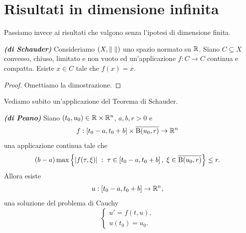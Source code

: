 \section{Risultati in dimensione infinita}
Passiamo invece ai risultati che valgono senza l'ipotesi di dimensione finita.
\begin{teorema}\emph{\textbf{(di Schauder)}}
	Consideriamo $(X,\norm{\;})$ uno spazio normato su $\R$. Siano $C \subseteq X$ convesso, chiuso, limitato e non vuoto
	ed un'applicazione $f: C \to C$ continua e compatta. Esiste $x \in C$ tale che $f(x) = x$.
\end{teorema}
\begin{proof}
	Omettiamo la dimostrazione.
\end{proof}
Vediamo subito un'applicazione del Teorema di Schauder.
\begin{teorema}\textbf{\emph{(di Peano)}}
	Siano $ (t_{0},u_{0}) \in \R\times\R^{n}$, $ a,b,r >0 $ e  
	\[ f: \left[t_{0} - a,t_{0}+b\right] \times \overline{\textup{B}(u_{0},r)} \to \R^{n} \]
	una applicazione continua tale che 
	\[ (b-a)\max\left\lbrace \abs*{f(\tau,\xi)} \; : \; \tau \in \left[t_{0} - a,t_{0} +b\right], \; \xi \in \overline{\textup{B}(u_{0},r)}\right\rbrace \le r. \]
	Allora esiste 
	\[ u: \left[t_{0} - a,t_{0}+b\right] \to \R^{n}, \]
	una soluzione del problema di Cauchy
	\[ \begin{cases}
		u' = f(t,u), \\
		u(t_{0}) = u_{0}.
	\end{cases} \]
\end{teorema}
